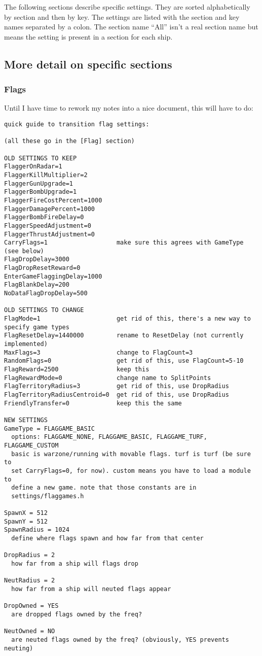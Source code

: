 \documentclass{article}
\begin{document}
The following sections describe specific settings. They are sorted
alphabetically by section and then by key. The settings are listed with
the section and key names separated by a colon. The section name ``All''
isn't a real section name but means the setting is present in a section
for each ship.



\subsection{More detail on specific sections}

\subsubsection{Flags}

Until I have time to rework my notes into a nice document, this will
have to do:

\begin{verbatim}
quick guide to transition flag settings:

(all these go in the [Flag] section)

OLD SETTINGS TO KEEP
FlaggerOnRadar=1
FlaggerKillMultiplier=2
FlaggerGunUpgrade=1
FlaggerBombUpgrade=1
FlaggerFireCostPercent=1000
FlaggerDamagePercent=1000
FlaggerBombFireDelay=0
FlaggerSpeedAdjustment=0
FlaggerThrustAdjustment=0
CarryFlags=1                   make sure this agrees with GameType (see below)
FlagDropDelay=3000
FlagDropResetReward=0
EnterGameFlaggingDelay=1000
FlagBlankDelay=200
NoDataFlagDropDelay=500

OLD SETTINGS TO CHANGE
FlagMode=1                     get rid of this, there's a new way to specify game types
FlagResetDelay=1440000         rename to ResetDelay (not currently implemented)
MaxFlags=3                     change to FlagCount=3
RandomFlags=0                  get rid of this, use FlagCount=5-10
FlagReward=2500                keep this
FlagRewardMode=0               change name to SplitPoints
FlagTerritoryRadius=3          get rid of this, use DropRadius
FlagTerritoryRadiusCentroid=0  get rid of this, use DropRadius
FriendlyTransfer=0             keep this the same

NEW SETTINGS
GameType = FLAGGAME_BASIC
  options: FLAGGAME_NONE, FLAGGAME_BASIC, FLAGGAME_TURF, FLAGGAME_CUSTOM
  basic is warzone/running with movable flags. turf is turf (be sure to
  set CarryFlags=0, for now). custom means you have to load a module to
  define a new game. note that those constants are in
  settings/flaggames.h

SpawnX = 512
SpawnY = 512
SpawnRadius = 1024
  define where flags spawn and how far from that center

DropRadius = 2
  how far from a ship will flags drop

NeutRadius = 2
  how far from a ship will neuted flags appear

DropOwned = YES
  are dropped flags owned by the freq?

NeutOwned = NO
  are neuted flags owned by the freq? (obviously, YES prevents neuting)
\end{verbatim}
\end{document}
